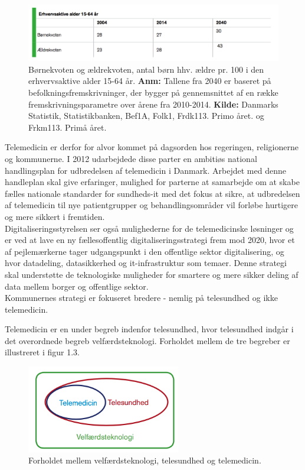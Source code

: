 \begin{figure}[H]
	\centering
	\caption{\cite{KL} Børnekvoten og ældrekvoten, antal børn hhv. ældre pr. 100 i den erhvervsaktive alder 15-64 år. \textbf{Anm:} Tallene fra 2040 er baseret på befolkningsfremskrivninger, der bygger på gennemsnittet af en række fremskrivningsparametre over årene fra 2010-2014. \textbf{Kilde:} Danmarks Statistik, Statistikbanken, Bef1A, Folk1, Frdk113. Primo året. og Frkm113. Primå året.}
	\includegraphics[width=1\textwidth]{Figurer/Snip20160513_6}
\end{figure}    

Telemedicin er derfor for alvor kommet på dagsorden hos regeringen, religionerne og kommunerne. I 2012 udarbejdede disse parter en ambitiøs national handlingsplan for udbredelsen af telemedicin i Danmark.\cite{Digst} Arbejdet med denne handleplan skal give erfaringer, mulighed for parterne at samarbejde om at skabe fælles nationale standarder for sundheds-it med det fokus at sikre, at udbredelsen af telemedicin til nye patientgrupper og behandlingsområder vil forløbe hurtigere og mere sikkert i fremtiden.\cite{NationalH}\\
Digitaliseringsstyrelsen ser også mulighederne for de telemedicinske løsninger og er ved at lave en ny fællesoffentlig digitaliseringsstrategi frem mod 2020, hvor et af pejlemærkerne tager udgangspunkt i den offentlige sektor digitalisering, og hvor datadeling, datasikkerhed og it-infrastruktur som temaer.\cite{digst1} Denne strategi skal understøtte de teknologiske muligheder for smartere og mere sikker deling af data mellem borger og offentlige sektor.\cite{digst2}\\
Kommunernes strategi er fokuseret bredere - nemlig på telesundhed og ikke telemedicin.

Telemedicin er en under begreb indenfor telesundhed, hvor telesundhed indgår i det overordnede begreb velfærdsteknologi.\cite{KLs} Forholdet mellem de tre begreber er illustreret i figur 1.3. 

\begin{figure}[H]
	\centering
		\caption{Forholdet mellem velfærdsteknologi, telesundhed og telemedicin.\cite{KLs}}
	\includegraphics[width=0.6\textwidth]{Figurer/Snip20160426_6}
\end{figure}



